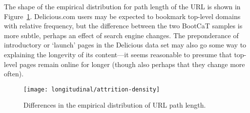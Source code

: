 The shape of the empirical distribution for path length of the URL is shown in Figure~\ref{fig:longitudinal:attrition:attrition-density}.  Delicious.com users may be expected to bookmark top-level domains with relative frequency, but the difference between the two BootCaT samples is more subtle, perhaps an effect of search engine changes.  The preponderance of introductory or `launch' pages in the Delicious data set may also go some way to explaining the longevity of its content---it seems reasonable to presume that top-level pages remain online for longer (though also perhaps that they change more often).


\begin{figure}[Ht]
    \centering
    \texttt{[image: longitudinal/attrition-density]}
    \caption{Differences in the empirical distribution of URL path length.}
    \label{fig:longitudinal:attrition:attrition-density}
\end{figure}


